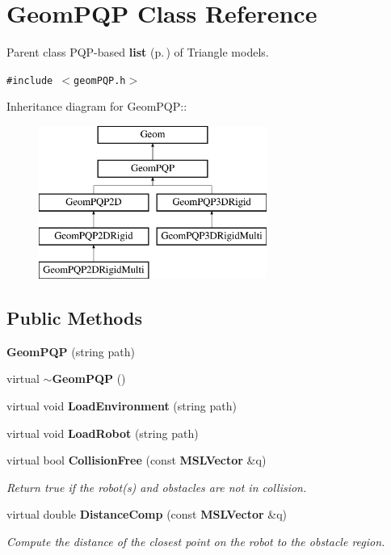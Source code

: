 \section{Geom\-PQP  Class Reference}
\label{classGeomPQP}
Parent class PQP-based {\bf list} {\rm (p.\,\pageref{classlist})} of Triangle models. 


{\tt \#include $<$geom\-PQP.h$>$}

Inheritance diagram for Geom\-PQP::\begin{figure}[H]
\begin{center}
\leavevmode
\includegraphics[height=5cm]{classGeomPQP}
\end{center}
\end{figure}
\subsection*{Public Methods}
\begin{CompactItemize}
\item 
{\bf Geom\-PQP} (string path)
\item 
virtual {\bf $\sim$Geom\-PQP} ()
\item 
virtual void {\bf Load\-Environment} (string path)
\item 
virtual void {\bf Load\-Robot} (string path)
\item 
virtual bool {\bf Collision\-Free} (const {\bf MSLVector} \&q)
\begin{CompactList}\small\item\em Return true if the robot(s) and obstacles are not in collision.\item\end{CompactList}\item 
virtual double {\bf Distance\-Comp} (const {\bf MSLVector} \&q)
\begin{CompactList}\small\item\em Compute the distance of the closest point on the robot to the obstacle region.\item\end{CompactList}\end{CompactItemize}
